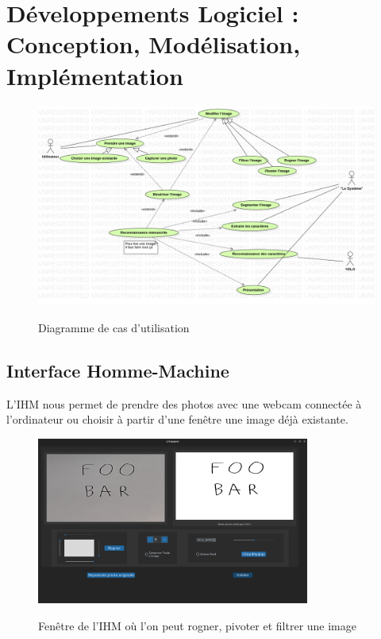 \documentclass[a4paper]{article}
\begin{document}
	\section{Développements Logiciel : Conception, Modélisation, Implémentation}
		\begin{figure}[h]
			\caption{Diagramme de cas d'utilisation}
			\includegraphics[width=\textwidth]{UseCaseDiagram.png}
			\centering
			\label{fig:useCaseDiagram}
		\end{figure}
		\subsection{Interface Homme-Machine}
			L'IHM nous permet de prendre des photos avec une webcam connectée à l'ordinateur ou choisir à partir d'une fenêtre une image déjà existante. 
			\begin{figure}[H]
				\caption{Fenêtre de l'IHM où l'on peut rogner, pivoter et filtrer une image}
				\includegraphics[width=0.8\textwidth]{modif.png}
				\centering
				\label{fig:modif}
			\end{figure}
\end{document}
